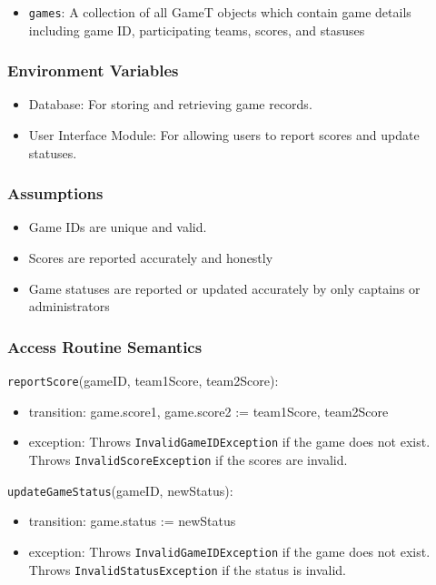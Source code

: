 \documentclass[12pt, titlepage]{article}
\begin{document}
\begin{itemize}
  \item \texttt{games}: A collection of all GameT objects which contain game details including game ID, participating teams, scores, and stasuses
\end{itemize}

\subsubsection{Environment Variables}

\begin{itemize}
  \item Database: For storing and retrieving game records.
  \item User Interface Module: For allowing users to report scores and update statuses.
\end{itemize}

\subsubsection{Assumptions}

\begin{itemize}
  \item Game IDs are unique and valid.
  \item Scores are reported accurately and honestly
  \item Game statuses are reported or updated accurately by only captains or administrators
\end{itemize}

\subsubsection{Access Routine Semantics}

\noindent \texttt{reportScore}(gameID, team1Score, team2Score):
\begin{itemize}
  \item transition: game.score1, game.score2 := team1Score, team2Score
  \item exception: Throws \texttt{InvalidGameIDException} if the game does not exist. Throws \texttt{InvalidScoreException} if the scores are invalid.
\end{itemize}

\noindent \texttt{updateGameStatus}(gameID, newStatus):
\begin{itemize}
  \item transition: game.status := newStatus
  \item exception: Throws \texttt{InvalidGameIDException} if the game does not exist. Throws \texttt{InvalidStatusException} if the status is invalid.
\end{itemize}
\end{document}
